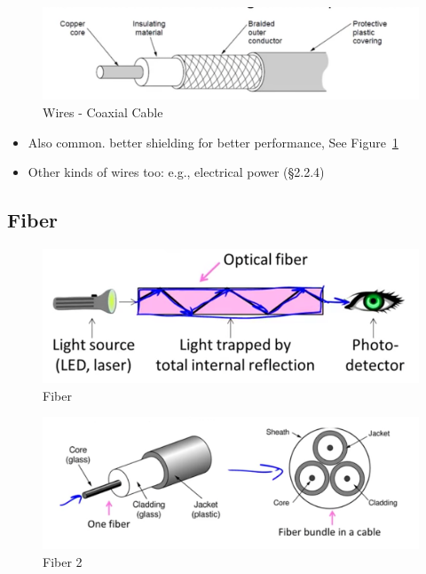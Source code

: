 \documentclass[12pt]{ctexart}   %
\begin{document}
	\begin{figure}[h!] %
	 \centering
	 \includegraphics[scale=0.7]{images/2-2-2}
	\caption{ Wires - Coaxial Cable}
	 \label{fig:2-2-2}
	 \end{figure}
	 
	\begin{itemize}
		\item Also common. better shielding for better performance, See Figure~\ref{fig:2-2-2}
		\item Other kinds of wires too: e.g., electrical power (§2.2.4)
	\end{itemize}
	
	\subsection{Fiber}
	
	\begin{figure}[h!] %
	 \centering
	 \includegraphics[scale=0.7]{images/2-2-3}
	\caption{ Fiber}
	 \label{fig:2-2-3}
	 \end{figure}
	 
	 \begin{figure}[h!] %
	 \centering
	 \includegraphics[scale=0.7]{images/2-2-4}
	\caption{ Fiber 2}
	 \label{fig:2-2-4}
	 \end{figure}
	 
\end{document}
